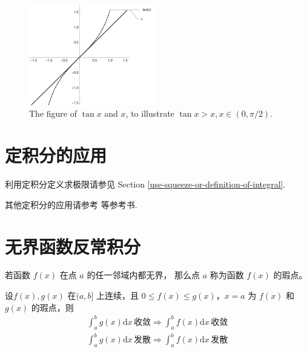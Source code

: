 \begin{figure}
    \centering
    \includegraphics[width=0.5\textwidth]{figure/tanx-x.pdf}
    \caption{The figure of $\tan x$ and $x$, to illustrate $\tan x > x, x \in (0, \pi/2)$.}
    \label{fig:tanx-x}
\end{figure}

\section{定积分的应用}\label{app-finite-integral}

利用定积分定义求极限请参见
Section \ref{use-squeeze-or-definition-of-integral}.

其他定积分的应用请参考
\cite[page 435]{stewart}等参考书.

\section{无界函数反常积分}

\begin{definition}
    若函数 $f(x)$ 在点 $a$ 的任一邻域内都无界，
    那么点 $a$ 称为函数 $f(x)$ 的瑕点。
\end{definition}

\begin{theorem}[比较判别法]
    \label{comparasion-deterministic-informal-integral}
    设$f(x), g(x)$ 在$(a, b]$ 上连续，且
    $0 \leq f(x) \leq g(x)$，$x = a$ 为 $f(x)$ 和 $g(x)$ 的瑕点，则
    \begin{gather*}
        \int_a^b g(x) \mathrm dx \, \mbox{收敛} \Rightarrow \int_a^b f(x) \mathrm dx \, \mbox{收敛} \\
        \int_a^b g(x) \mathrm dx \, \mbox{发散} \Rightarrow \int_a^b f(x) \mathrm dx \, \mbox{发散} 
    \end{gather*}
\end{theorem}

